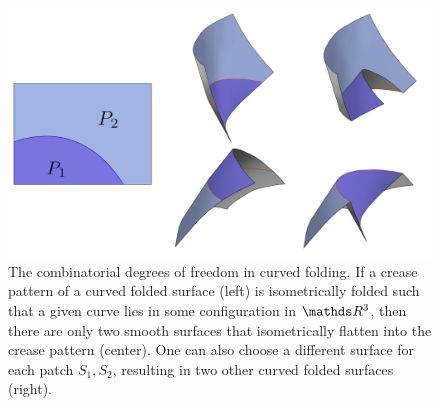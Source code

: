 \begin{figure} [h]
	\centering
	\includegraphics[width=\linewidth]{figures/curved_fold_through_curve.png}
	\caption{The combinatorial degrees of freedom in curved folding. If a crease pattern of a curved folded surface (left) is isometrically folded such that a given curve lies in some configuration in $\R^3$, then there are only two smooth surfaces that isometrically flatten into the crease pattern (center). One can also choose a different surface for each patch $S_1,S_2$, resulting in two other curved folded surfaces (right).}
	\label{fig:folding_combinatorics}
\end{figure}

